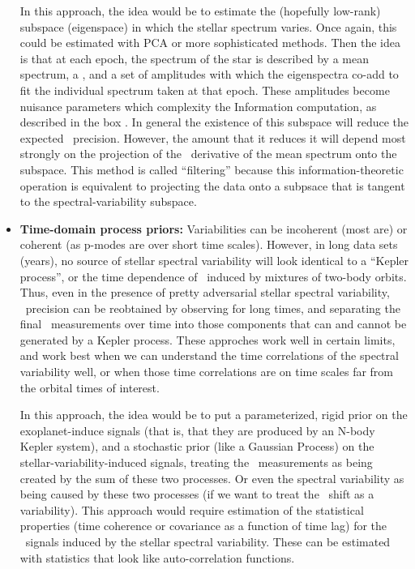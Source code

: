 \documentclass[12pt, letterpaper]{article}
\begin{document}
\begin{itemize}
In this approach, the idea would be to estimate the (hopefully
low-rank) subspace (eigenspace) in which the stellar spectrum varies.
Once again, this could be estimated with PCA or more sophisticated
methods.
Then the idea is that at each epoch, the spectrum of the star is
described by a mean spectrum, a \RV, and a set of amplitudes with
which the eigenspectra co-add to fit the individual spectrum taken at
that epoch.
These amplitudes become nuisance parameters which complexity the
Information computation, as described in the box .
In general the existence of this subspace will reduce the expected
\RV\ precision.
However, the amount that it reduces it will depend most strongly on
the projection of the \RV\ derivative of the mean spectrum onto the
subspace.
This method is called ``filtering'' because this information-theoretic
operation is equivalent to projecting the data onto a subpsace that is
tangent to the spectral-variability subspace.
\item
\textbf{Time-domain process priors:}
Variabilities can be incoherent (most are) or coherent (as p-modes are
over short time scales).
However, in long data sets (years), no source of stellar spectral
variability will look identical to a ``Kepler process'', or the time
dependence of \RV\ induced by mixtures of two-body orbits.
Thus, even in the presence of pretty adversarial stellar spectral
variability, \EPRV\ precision can be reobtained by observing for long
times, and separating the final \RV\ measurements over time into those
components that can and cannot be generated by a Kepler process.
These approches work well in certain limits, and work best when we can
understand the time correlations of the spectral variability well, or
when those time correlations are on time scales far from the orbital
times of interest.

In this approach, the idea would be to put a parameterized, rigid
prior on the exoplanet-induce signals (that is, that they are produced
by an N-body Kepler system), and a stochastic prior (like a Gaussian
Process) on the stellar-variability-induced signals, treating the
\RV\ measurements as being created by the sum of these two
processes.
Or even the spectral variability as being caused by these two
processes (if we want to treat the \RV\ shift as a variability).
This approach would require estimation of the statistical properties
(time coherence or covariance as a function of time lag) for the
\RV\ signals induced by the stellar spectral variability.
These can be estimated with statistics that look like auto-correlation
functions.


\end{itemize}
\end{document}
